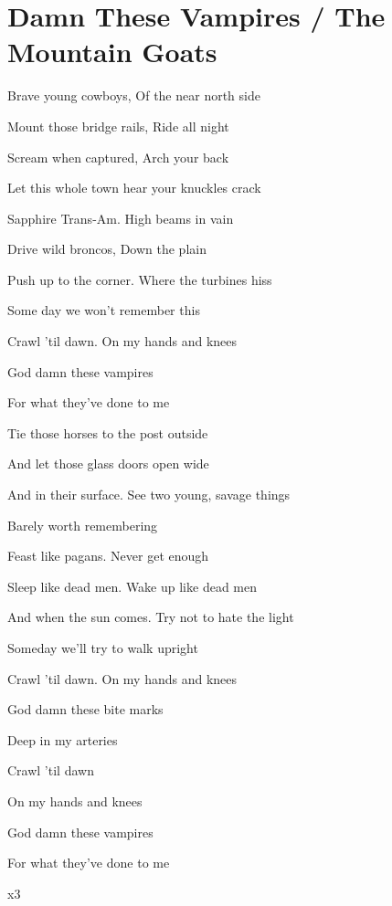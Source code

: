 \section{Damn These Vampires / The Mountain Goats}\label{sec:damnthesevampires}

\Amajor
\Gmajor
\FsharpMinor
\Dmajor

Brave young cowboys, Of the near north side

Mount those bridge rails, Ride all night

Scream when captured, Arch your back

Let this whole town hear your knuckles crack

Sapphire Trans-Am. High beams in vain

Drive wild broncos, Down the plain

Push up to the corner. Where the turbines hiss

Some day we won't remember this

Crawl 'til dawn. On my hands and knees

God damn these vampires

For what they've done to me

Tie those horses to the post outside

And let those glass doors open wide 

And in their surface. See two young, savage things

Barely worth remembering

Feast like pagans. Never get enough

Sleep like dead men. Wake up like dead men

And when the sun comes. Try not to hate the light

Someday we'll try to walk upright

Crawl 'til dawn. On my hands and knees

God damn these bite marks

Deep in my arteries

Crawl 'til dawn
    
On my hands and knees

God damn these vampires

For what they've done to me

   x3

  
